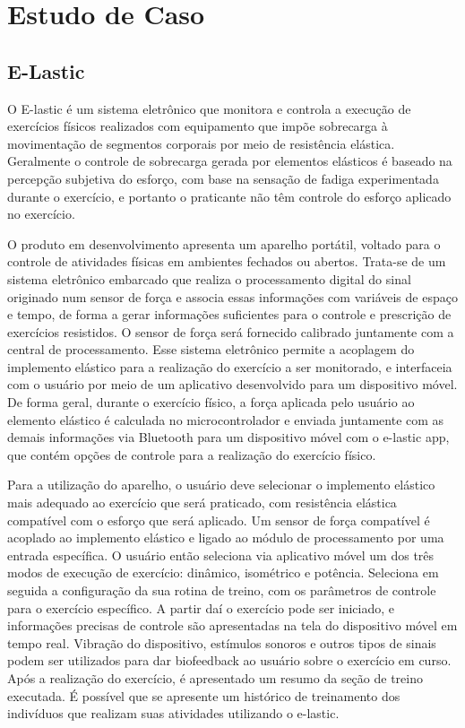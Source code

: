 \chapter{Estudo de Caso}

\section{E-Lastic}
O E-lastic é um sistema eletrônico que monitora e controla a execução de exercícios físicos realizados com equipamento que impõe sobrecarga à movimentação de segmentos corporais por meio de resistência elástica. Geralmente o controle de sobrecarga gerada por elementos elásticos é baseado na percepção subjetiva do esforço, com base na sensação de fadiga experimentada durante o exercício, e portanto o praticante não têm controle do esforço aplicado no exercício.

O produto em desenvolvimento apresenta um aparelho portátil, voltado para o controle de atividades físicas em ambientes fechados ou abertos. Trata-se de um sistema eletrônico embarcado que realiza o processamento digital do sinal originado num sensor de força e associa essas informações com variáveis de espaço e tempo, de forma a gerar informações suficientes para o controle e prescrição de exercícios resistidos. O sensor de força será fornecido calibrado juntamente com a central de processamento. Esse sistema eletrônico permite a acoplagem do implemento elástico para a realização do exercício a ser monitorado, e interfaceia com o usuário por meio de um aplicativo desenvolvido para um dispositivo móvel. De forma geral, durante o exercício físico, a força aplicada pelo usuário ao elemento elástico é calculada no microcontrolador e enviada juntamente com as demais informações via Bluetooth para um dispositivo móvel com o e-lastic app, que contém opções de controle para a realização do exercício físico.

Para a utilização do aparelho, o usuário deve selecionar o implemento elástico mais adequado ao exercício que será praticado, com resistência elástica compatível com o esforço que será aplicado. Um sensor de força compatível é acoplado ao implemento elástico e ligado ao módulo de processamento por uma entrada específica. O usuário então seleciona via aplicativo móvel um dos três modos de execução de exercício: dinâmico, isométrico e potência. Seleciona em seguida a configuração da sua rotina de treino, com os parâmetros de controle para o exercício específico. A partir daí o exercício pode ser iniciado, e informações precisas de controle são apresentadas na tela do dispositivo móvel em tempo real. Vibração do dispositivo, estímulos sonoros e outros tipos de sinais podem ser utilizados para dar biofeedback ao usuário sobre o exercício em curso. Após a realização do exercício, é apresentado um resumo da seção de treino executada. É possível que se apresente um histórico de treinamento dos indivíduos que realizam suas atividades utilizando o e-lastic.

